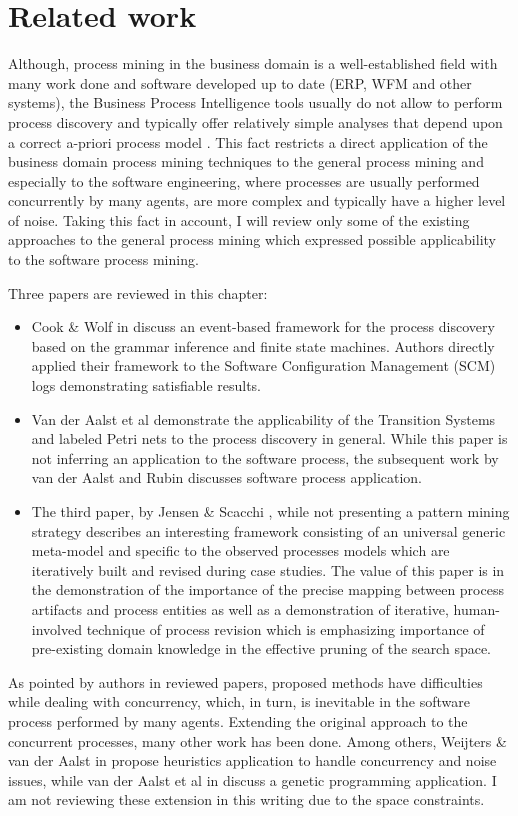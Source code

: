 \chapter{Related work} \label{related.work}
Although, process mining in the business domain is a well-established field with many work done and software developed up to date (ERP, WFM and other systems), the Business Process Intelligence tools usually do not allow to perform process discovery and typically offer relatively simple analyses that depend upon a correct a-priori process model \cite{citeulike:3718014} \cite{citeulike:5044991}. This fact restricts a direct application of the business domain process mining techniques to the general process mining and especially to the software engineering, where processes are usually performed concurrently by many agents, are more complex and typically have a higher level of noise. Taking this fact in account, I will review only some of the existing approaches to the general process mining which expressed possible applicability to the software process mining. 

Three papers are reviewed in this chapter: 
\begin{itemize}
	\item Cook \& Wolf in \cite{citeulike:328044} discuss an event-based framework for the process discovery based on the grammar inference and finite state machines. Authors directly applied their framework to the Software Configuration Management (SCM) logs demonstrating satisfiable results. 
	\item Van der Aalst et al \cite{citeulike:3718014} demonstrate the applicability of the Transition Systems and labeled Petri nets to the process discovery in general. While this paper is not inferring an application to the software process, the subsequent work by van der Aalst and Rubin \cite{citeulike:1885717} discusses software process application.
	\item The third paper, by Jensen \& Scacchi \cite{citeulike:5043664}, while not presenting a pattern mining strategy describes an interesting framework consisting of an universal generic meta-model and specific to the observed processes models which are iteratively built and revised during case studies. The value of this paper is in the demonstration of the importance of the precise mapping between process artifacts and process entities as well as a demonstration of iterative, human-involved technique of process revision which is emphasizing importance of pre-existing domain knowledge in the effective pruning of the search space.
\end{itemize}
As pointed by authors in reviewed papers, proposed methods have difficulties while dealing with concurrency, which, in turn, is inevitable in the software process performed by many agents. Extending the original approach to the concurrent processes, many other work has been done. Among others, Weijters \& van der Aalst in \cite{citeulike:5128101} propose heuristics application to handle concurrency and noise issues, while van der Aalst et al in \cite{citeulike:5128101} discuss a genetic programming application. I am not reviewing these extension in this writing due to the space constraints.
